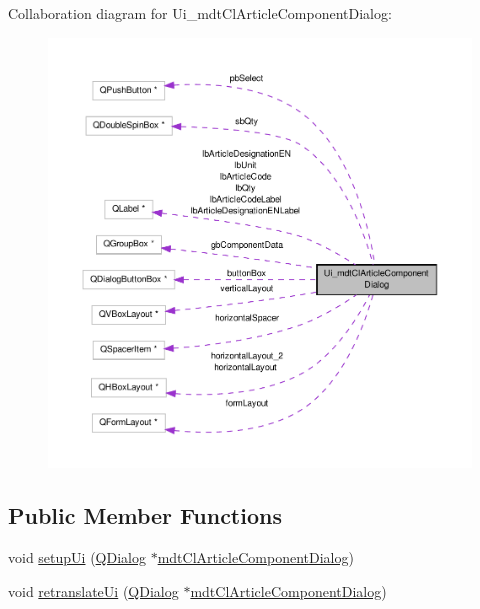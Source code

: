 Collaboration diagram for Ui\-\_\-mdt\-Cl\-Article\-Component\-Dialog\-:
\nopagebreak
\begin{figure}[H]
\begin{center}
\leavevmode
\includegraphics[width=350pt]{class_ui__mdt_cl_article_component_dialog__coll__graph}
\end{center}
\end{figure}
\subsection*{Public Member Functions}
\begin{DoxyCompactItemize}
\item 
void \hyperlink{class_ui__mdt_cl_article_component_dialog_a7056d3e70d0c05bf520b93ea45b47077}{setup\-Ui} (\hyperlink{class_q_dialog}{Q\-Dialog} $\ast$\hyperlink{classmdt_cl_article_component_dialog}{mdt\-Cl\-Article\-Component\-Dialog})
\item 
void \hyperlink{class_ui__mdt_cl_article_component_dialog_a2cce20b6332d1e4d335208f611b381c6}{retranslate\-Ui} (\hyperlink{class_q_dialog}{Q\-Dialog} $\ast$\hyperlink{classmdt_cl_article_component_dialog}{mdt\-Cl\-Article\-Component\-Dialog})
\end{DoxyCompactItemize}
